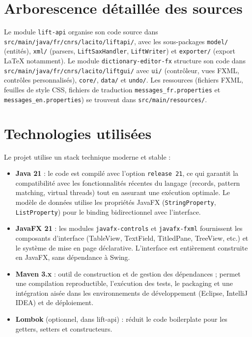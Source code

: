\documentclass[11pt,twoside,openany]{book}
\begin{document}
\section{Arborescence détaillée des sources}

Le module \texttt{lift-api} organise son code source dans \texttt{src/main/java/fr/cnrs/lacito/liftapi/}, avec les sous-packages \texttt{model/} (entités), \texttt{xml/} (parsers, \texttt{LiftSaxHandler}, \texttt{LiftWriter}) et \texttt{exporter/} (export LaTeX notamment). Le module \texttt{dictionary-editor-fx} structure son code dans \texttt{src/main/java/fr/cnrs/lacito/liftgui/} avec \texttt{ui/} (contrôleur, vues FXML, contrôles personnalisés), \texttt{core/}, \texttt{data/} et \texttt{undo/}. Les ressources (fichiers FXML, feuilles de style CSS, fichiers de traduction \texttt{messages\_fr.properties} et \texttt{messages\_en.properties}) se trouvent dans \texttt{src/main/resources/}.

\section{Technologies utilisées}

Le projet utilise un stack technique moderne et stable :

\begin{itemize}
\item \textbf{Java 21} : le code est compilé avec l'option \texttt{release 21}, ce qui garantit la compatibilité avec les fonctionnalités récentes du langage (records, pattern matching, virtual threads) tout en assurant une exécution optimale. Le modèle de données utilise les propriétés JavaFX (\texttt{StringProperty}, \texttt{ListProperty}) pour le binding bidirectionnel avec l'interface.
\item \textbf{JavaFX 21} : les modules \texttt{javafx-controls} et \texttt{javafx-fxml} fournissent les composants d'interface (TableView, TextField, TitledPane, TreeView, etc.) et le système de mise en page déclarative. L'interface est entièrement construite en JavaFX, sans dépendance à Swing.
\item \textbf{Maven 3.x} : outil de construction et de gestion des dépendances ; permet une compilation reproductible, l'exécution des tests, le packaging et une intégration aisée dans les environnements de développement (Eclipse, IntelliJ IDEA) et de déploiement.
\item \textbf{Lombok} (optionnel, dans lift-api) : réduit le code boilerplate pour les getters, setters et constructeurs.
\end{itemize}
\end{document}
